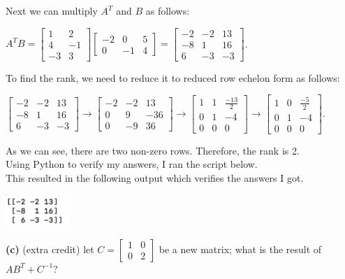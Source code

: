 \documentclass[a4paper]{article}
\begin{document}
Next we can multiply $A^T$ and $B$ as follows:
\begin{center}
$A^TB =
\begin{bmatrix}
  1 & 2\\
  4 & -1\\
  -3 & 3
\end{bmatrix}
\begin{bmatrix}
  -2 & 0 & 5\\
  0 & -1 & 4
\end{bmatrix}=
\begin{bmatrix}
  -2 & -2 & 13\\
  -8 & 1 & 16\\
  6 & -3 & -3
\end{bmatrix}$.
\end{center}
To find the rank, we need to reduce it to reduced row echelon form as follows:
\begin{center}
  $\begin{bmatrix}
    -2 & -2 & 13\\
    -8 & 1 & 16\\
    6 & -3 & -3
  \end{bmatrix}
  \to
  \begin{bmatrix}
    -2 & -2 & 13\\
    0 & 9 & -36\\
    0 & -9 & 36
  \end{bmatrix}
  \to
  \begin{bmatrix}
    1 & 1 & \frac{-13}{2}\\
    0 & 1 & -4\\
    0 & 0 & 0
  \end{bmatrix}
  \to
  \begin{bmatrix}
    1 & 0 & \frac{-5}{2}\\
    0 & 1 & -4\\
    0 & 0 & 0
  \end{bmatrix}$.
\end{center}
As we can see, there are two non-zero rows.  Therefore, the rank is 2.\\
Using Python to verify my answers, I ran the script below.\\

This resulted in the following output which verifies the answers I got.\\
\begin{center}
  \includegraphics[width=0.18\textwidth]{goodMatrix.jpg}
\end{center}
\textbf{(c)} (extra credit) let $C =
\begin{bmatrix}
  1 & 0\\
  0 & 2
\end{bmatrix}$
be a new matrix; what is the result of $AB^T+C^{-1}$?\\
\end{document}
